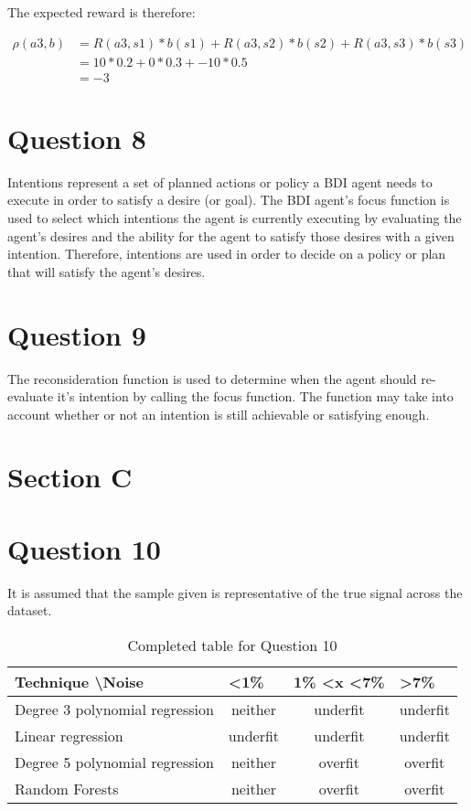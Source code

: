\documentclass[12pt,notitlepage]{article}
\newcommand{\question}{\section*}
\begin{document}
The expected reward is therefore:

\begin{align*}    
    \rho(a3,b) &= R(a3,s1)*b(s1) + R(a3,s2)*b(s2) + R(a3,s3)*b(s3)\\
    &= 10*0.2 + 0*0.3 + -10*0.5 \\
    &= -3
\end{align*}

\question{Question 8}

Intentions represent a set of planned actions or policy a BDI agent needs to execute in order to
satisfy a desire (or goal). The BDI agent's focus function is used to select
which intentions the agent is currently executing by evaluating the agent's
desires and the ability for the agent to satisfy those desires with a given
intention. Therefore, intentions are used in order to decide on a policy or plan
that will satisfy the agent's desires. 

\question{Question 9}

The reconsideration function is used to determine when the agent should
re-evaluate it's intention by calling the focus function. The function may take
into account whether or not an intention is still achievable or satisfying
enough.

\pagebreak

\section*{Section C}
\question{Question 10}

It is assumed that the sample given is representative of the true signal across
the dataset.

\begin{table}[h]
\centering
\caption{Completed table for Question 10}
\label{my-label}
\begin{tabular}{|l|c|c|c|}
\hline
\textbf{Technique \textbackslash Noise} & \multicolumn{1}{l|}{\textbf{\textless1\%}} & \multicolumn{1}{l|}{\textbf{1\% \textless x \textless 7\%}} & \multicolumn{1}{l|}{\textbf{\textgreater 7\%}} \\ \hline
Degree 3 polynomial regression          & neither                                    & underfit                                                    & underfit                                       \\ \hline
Linear regression                       & underfit                                   & underfit                                                    & underfit                                       \\ \hline
Degree 5 polynomial regression          & neither                                    & overfit                                                     & overfit                                        \\ \hline
Random Forests                          & neither
    & overfit                                                     & overfit                                       \\ \hline
\end{tabular}
\end{table}
\end{document}
